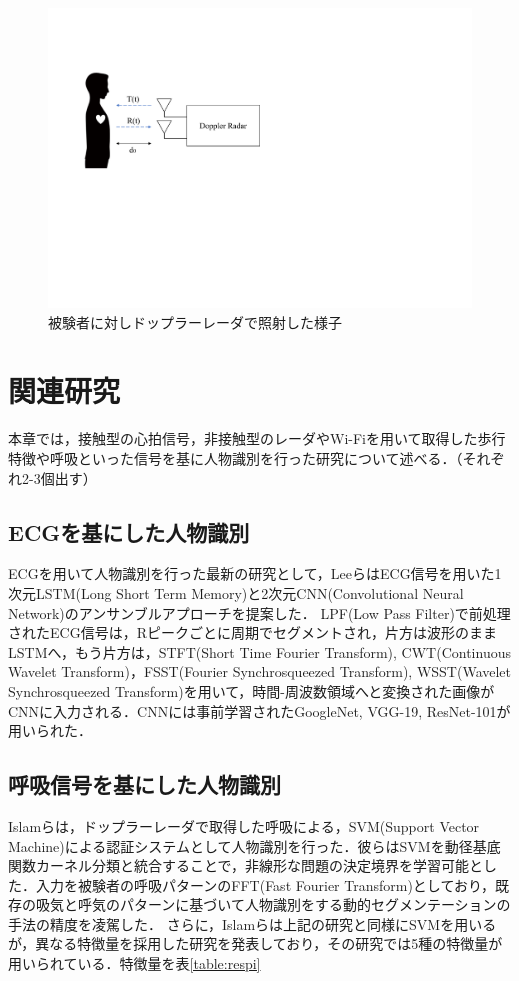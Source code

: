 \begin{figure}[H]
\begin{center}
\includegraphics[width=\linewidth]{./fig/radar_figure_trim.pdf}
\end{center}
\caption{被験者に対しドップラーレーダで照射した様子}
\label{fig:radar}
\end{figure}

\chapter{関連研究}
本章では，接触型の心拍信号，非接触型のレーダやWi-Fiを用いて取得した歩行特徴や呼吸といった信号を基に人物識別を行った研究について述べる．（それぞれ2-3個出す）
\section{ECGを基にした人物識別}
ECGを用いて人物識別を行った最新の研究として，LeeらはECG信号を用いた1次元LSTM(Long Short Term Memory)と2次元CNN(Convolutional Neural Network)のアンサンブルアプローチを提案した．
LPF(Low Pass Filter)で前処理されたECG信号は，Rピークごとに周期でセグメントされ，片方は波形のままLSTMへ，もう片方は，STFT(Short Time Fourier Transform), CWT(Continuous Wavelet Transform)，FSST(Fourier Synchrosqueezed Transform), WSST(Wavelet Synchrosqueezed Transform)を用いて，時間-周波数領域へと変換された画像がCNNに入力される．CNNには事前学習されたGoogleNet, VGG-19, ResNet-101が用いられた．


\section{呼吸信号を基にした人物識別}
Islamらは，ドップラーレーダで取得した呼吸による，SVM(Support Vector Machine)による認証システムとして人物識別を行った\cite{paper:respi_svm}．彼らはSVMを動径基底関数カーネル分類と統合することで，非線形な問題の決定境界を学習可能とした．入力を被験者の呼吸パターンのFFT(Fast Fourier Transform)としており，既存の吸気と呼気のパターンに基づいて人物識別をする動的セグメンテーションの手法\cite{paper:dynamic1}\cite{paper:dynamic2}の精度を凌駕した．
さらに，Islamらは上記の研究と同様にSVMを用いるが，異なる特徴量を採用した研究を発表しており，その研究では5種の特徴量が用いられている．特徴量を表\ref{table:respi}

